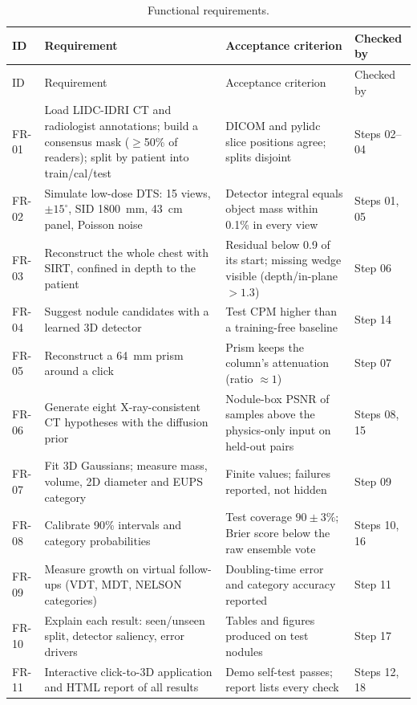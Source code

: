 {\small
\begin{longtable}{>{\raggedright\arraybackslash}p{1.1cm} >{\raggedright\arraybackslash}p{5.6cm} >{\raggedright\arraybackslash}p{5.0cm} >{\raggedright\arraybackslash}p{1.6cm}}
\caption{Functional requirements.}\label{tab:fr}\\
\toprule
ID & Requirement & Acceptance criterion & Checked by \\
\midrule
\endfirsthead
\toprule
ID & Requirement & Acceptance criterion & Checked by \\
\midrule
\endhead
FR-01 & Load LIDC-IDRI CT and radiologist annotations; build a consensus mask ($\geq$50\% of readers); split by patient into train/cal/test & DICOM and pylidc slice positions agree; splits disjoint & Steps 02--04 \\
FR-02 & Simulate low-dose DTS: 15 views, $\pm15^\circ$, SID 1800~mm, 43~cm panel, Poisson noise & Detector integral equals object mass within 0.1\% in every view & Steps 01, 05 \\
FR-03 & Reconstruct the whole chest with SIRT, confined in depth to the patient & Residual below 0.9 of its start; missing wedge visible (depth/in-plane $>1.3$) & Step 06 \\
FR-04 & Suggest nodule candidates with a learned 3D detector & Test CPM higher than a training-free baseline & Step 14 \\
FR-05 & Reconstruct a 64~mm prism around a click & Prism keeps the column's attenuation (ratio $\approx 1$) & Step 07 \\
FR-06 & Generate eight X-ray-consistent CT hypotheses with the diffusion prior & Nodule-box PSNR of samples above the physics-only input on held-out pairs & Steps 08, 15 \\
FR-07 & Fit 3D Gaussians; measure mass, volume, 2D diameter and EUPS category & Finite values; failures reported, not hidden & Step 09 \\
FR-08 & Calibrate 90\% intervals and category probabilities & Test coverage $90\pm3\%$; Brier score below the raw ensemble vote & Steps 10, 16 \\
FR-09 & Measure growth on virtual follow-ups (VDT, MDT, NELSON categories) & Doubling-time error and category accuracy reported & Step 11 \\
FR-10 & Explain each result: seen/unseen split, detector saliency, error drivers & Tables and figures produced on test nodules & Step 17 \\
FR-11 & Interactive click-to-3D application and HTML report of all results & Demo self-test passes; report lists every check & Steps 12, 18 \\
\bottomrule
\end{longtable}
}

